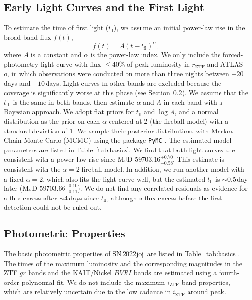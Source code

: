 \documentclass[twocolumn]{aastex631}
\newcommand{\sn}{SN\,2022joj}
\newcommand{\tfl}{$t_\mathrm{fl}$}
\begin{document}
\begin{CJK*}{UTF8}{gbsn}
\subsection{Early Light Curves and the First Light}
To estimate the time of first light ($t_\mathrm{fl}$), we assume an initial power-law rise in the broad-band flux $f(t)$,
$$
f(t) = A (t-t_\mathrm{fl})^\alpha,
$$
where $A$ is a constant and $\alpha$ is the power-law index. We only include the forced-photometry light curve with flux $\le$40\% of peak luminosity \citep{Miller_ZTF_2020} in $r_\mathrm{ZTF}$ and ATLAS $o$, in which observations were conducted on more than three nights between $-20$\,days and $-10$\,days. Light curves in other bands are excluded because the coverage is significantly worse at this phase (see Section~\ref{sec:analysis_phot}). We assume that the \tfl\ is the same in both bands, then estimate $\alpha$ and $A$ in each band with a Bayesian approach. We adopt flat priors for $t_\mathrm{fl}$ and $\log A$, and a normal distribution as the prior on each $\alpha$ centered at 2 (the fireball model) with a standard deviation of 1. We sample their posterior distributions with Markov Chain Monte Carlo (MCMC) using the package \texttt{PyMC} \citep{pymc_2016}. The estimated model parameters are listed in Table~\ref{tab:basics}. We find that both light curves are consistent with a power-law rise since MJD $59703.16^{+0.70}_{-0.58}$.
This estimate is consistent with the $\alpha=2$ fireball model. In addition, we run another model with a fixed $\alpha=2$, which also fits the light curve well, but the estimated $t_\mathrm{fl}$ is $\sim$0.5\,day later (MJD $59703.66_{-0.11}^{+0.10}$). We do not find any correlated residuals as evidence for a flux excess after $\sim$4\,days since $t_\mathrm{fl}$, although a flux excess before the first detection could not be ruled out.


\subsection{Photometric Properties} \label{sec:analysis_phot}
The basic photometric properties of \sn\ are listed in Table~\ref{tab:basics}. The times of the maximum luminosity and the corresponding magnitudes in the ZTF $gr$ bands and the KAIT/Nickel $BVRI$ bands are estimated using a fourth-order polynomial fit. We do not include the maximum $i_\mathrm{ZTF}$-band properties, which are relatively uncertain due to the low cadance in $i_\mathrm{ZTF}$ around peak. 


\end{CJK*}
\end{document}

